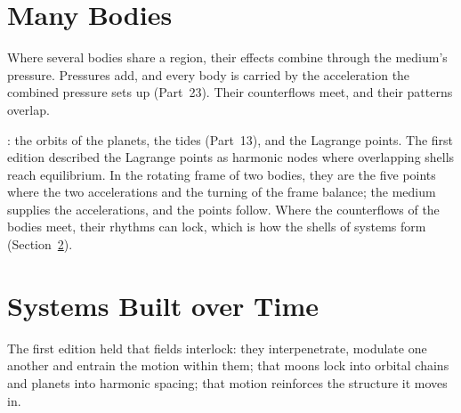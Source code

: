 \documentclass[11pt,a4paper]{article}
\begin{document}
\section{Many Bodies}
\label{sec:many}

\begin{hypbar}
Where several bodies share a region, their effects combine through the medium's pressure. Pressures add, and every body is carried by the acceleration the combined pressure sets up (Part~23). Their counterflows meet, and their patterns overlap.
\end{hypbar}

: the orbits of the planets, the tides (Part~13), and the Lagrange points. The first edition described the Lagrange points as harmonic nodes where overlapping shells reach equilibrium. In the rotating frame of two bodies, they are the five points where the two accelerations and the turning of the frame balance; the medium supplies the accelerations, and the points follow. Where the counterflows of the bodies meet, their rhythms can lock, which is how the shells of systems form (Section~\ref{sec:time}). 

\section{Systems Built over Time}
\label{sec:time}

The first edition held that fields interlock: they interpenetrate, modulate one another and entrain the motion within them; that moons lock into orbital chains and planets into harmonic spacing; that motion reinforces the structure it moves in. 
\end{document}
